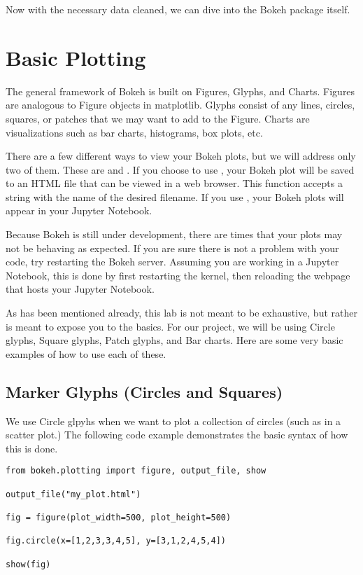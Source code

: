Now with the necessary data cleaned, we can dive into the Bokeh package itself.

\section*{Basic Plotting}

The general framework of Bokeh is built on Figures, Glyphs, and Charts.
Figures are analogous to Figure objects in matplotlib. Glyphs consist of any
lines, circles, squares, or patches that we may want to add to the Figure.
Charts are visualizations such as bar charts, histograms, box plots, etc.

There are a few different ways to view your Bokeh plots, but we will address only
two of them. These are  and .
If you choose to use , your Bokeh plot will be saved to an HTML
file that can be viewed in a web browser. This function accepts a string with
the name of the desired filename. If you use , your Bokeh plots
will appear in your Jupyter Notebook.

\begin{info}
    Because Bokeh is still under development, there are times that your plots
    may not be behaving as expected. If you are sure there is not a problem with
    your code, try restarting the Bokeh server. Assuming you are working in
    a Jupyter Notebook, this is done by first restarting the kernel, then
    reloading the webpage that hosts your Jupyter Notebook.
\end{info}

As has been mentioned already, this lab is not meant to be exhaustive, but
rather is meant to expose you to the basics. For our project, we will be using
Circle glyphs, Square glyphs, Patch glyphs, and Bar charts. Here are some very
basic examples of how to use each of these.

\subsection*{Marker Glyphs (Circles and Squares)}

We use Circle glpyhs when we want to plot a collection of circles (such as in
a scatter plot.) The following code example demonstrates the basic syntax of
how this is done.

\begin{lstlisting}
from bokeh.plotting import figure, output_file, show

output_file("my_plot.html")

fig = figure(plot_width=500, plot_height=500)

fig.circle(x=[1,2,3,3,4,5], y=[3,1,2,4,5,4])

show(fig)
\end{lstlisting}

